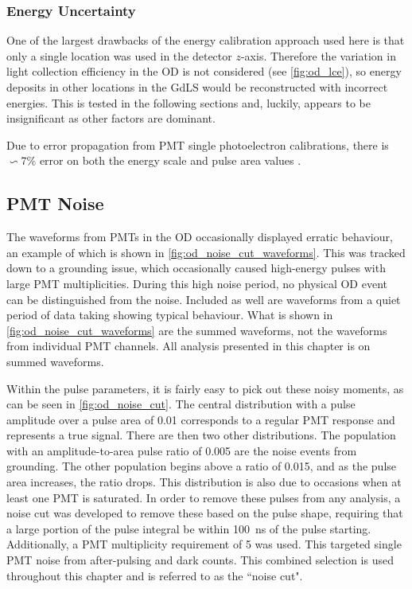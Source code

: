 \subsubsection{Energy Uncertainty}
\par
One of the largest drawbacks of the energy calibration approach used here is that only a single location was used in the detector $z$-axis.
Therefore the variation in light collection efficiency in the OD is not considered (see \autoref{fig:od_lce}), so energy deposits in other locations in the GdLS would be reconstructed with incorrect energies.
This is tested in the following sections and, luckily, appears to be insignificant as other factors are dominant.
\par
Due to error propagation from PMT single photoelectron calibrations, there is $\backsim$7\% error on both the energy scale and pulse area values \cite{ewanfraser_thesis_ref}.


\subsection{PMT Noise}
\par
The waveforms from PMTs in the OD occasionally displayed erratic behaviour, an example of which is shown in \autoref{fig:od_noise_cut_waveforms}.
This was tracked down to a grounding issue, which occasionally caused high-energy pulses with large PMT multiplicities.
During this high noise period, no physical OD event can be distinguished from the noise.
Included as well are waveforms from a quiet period of data taking showing typical behaviour.
What is shown in \autoref{fig:od_noise_cut_waveforms} are the summed waveforms, not the waveforms from individual PMT channels.
All analysis presented in this chapter is on summed waveforms.

\par
Within the pulse parameters, it is fairly easy to pick out these noisy moments, as can be seen in \autoref{fig:od_noise_cut}.
The central distribution with a pulse amplitude over a pulse area of 0.01 corresponds to a regular PMT response and represents a true signal.
There are then two other distributions.
The population with an amplitude-to-area pulse ratio of 0.005 are the noise events from grounding.
The other population begins above a ratio of 0.015, and as the pulse area increases, the ratio drops.
This distribution is also due to occasions when at least one PMT is saturated.
In order to remove these pulses from any analysis, a noise cut was developed to remove these based on the pulse shape, requiring that a large portion of the pulse integral be within 100~ns of the pulse starting.
Additionally, a PMT multiplicity requirement of 5 was used.
This targeted single PMT noise from after-pulsing and dark counts.
This combined selection is used throughout this chapter and is referred to as the ``noise cut".


